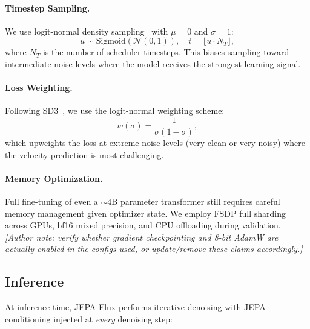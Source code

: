 \documentclass{article}
\begin{document}
\paragraph{Timestep Sampling.}
We use logit-normal density sampling~\cite{esser2024scaling} with $\mu=0$ and $\sigma=1$:
\begin{equation}
    u \sim \text{Sigmoid}(\mathcal{N}(0, 1)), \quad t = \lfloor u \cdot N_T \rfloor,
    \label{eq:timestep_sampling}
\end{equation}
where $N_T$ is the number of scheduler timesteps. This biases sampling toward intermediate noise levels where the model receives the strongest learning signal.

\paragraph{Loss Weighting.}
Following SD3~\cite{esser2024scaling}, we use the logit-normal weighting scheme:
\begin{equation}
    w(\sigma) = \frac{1}{\sigma(1 - \sigma)},
    \label{eq:weighting}
\end{equation}
which upweights the loss at extreme noise levels (very clean or very noisy) where the velocity prediction is most challenging.

\paragraph{Memory Optimization.}
Full fine-tuning of even a $\sim$4B parameter transformer still requires careful memory management given optimizer state. We employ FSDP full sharding across GPUs, bf16 mixed precision, and CPU offloading during validation. \textit{[Author note: verify whether gradient checkpointing and 8-bit AdamW are actually enabled in the configs used, or update/remove these claims accordingly.]}

\subsection{Inference}
\label{sec:inference}

At inference time, JEPA-Flux performs iterative denoising with JEPA conditioning injected at \emph{every} denoising step:
\end{document}
